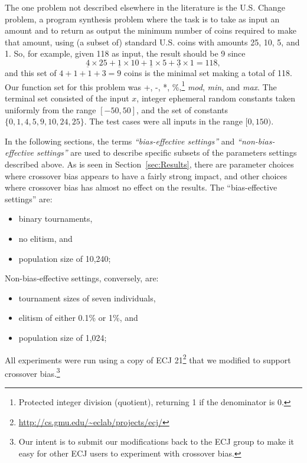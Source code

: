 \documentclass{sig-alternate}
\begin{document}
The one problem not described elsewhere in the literature is the U.S. Change problem, a program 
synthesis problem where the task is to take as input an amount and to return as output the minimum 
number of coins required to make that amount, using (a subset of) standard U.S. coins with amounts 
25, 10, 5, and 1. So, for example, given 118 as input, the result should be 9 since 
\[
	\underline{4} \times 25 + \underline{1} \times 10 + \underline{1} \times 5 + \underline{3} \times 1 = 118,
\]
and this set of $4+1+1+3 = 9$ coins is the minimal set 
making a total of 118. Our function set for this problem was +, -, *, \%,\footnote{Protected integer 
division (quotient), returning 1 if the denominator is 0.} \emph{mod}, \emph{min}, and \emph{max}. 
The terminal set consisted of the input $x$, integer ephemeral random constants taken uniformly 
from the range $[-50, 50]$, and the set of constants $\{ 0, 1, 4, 5, 9, 10, 24, 25 \}$. The test cases 
were all inputs in the range $[0, 150)$.


In the following sections, the terms \emph{``bias-effective settings''} and \emph{``non-bias-effective settings''} 
are used to
describe specific subsets of the parameters settings described above. As is seen in Section~\ref{sec:Results}, 
there are parameter choices where crossover bias appears to have a fairly strong impact, and other choices 
where crossover bias has almost no effect on the results. The ``bias-effective settings'' are:
\begin{itemize}
\item binary tournaments,
\item no elitism, and
\item population size of 10,240;
\end{itemize}
Non-bias-effective settings, conversely, are:
\begin{itemize}
\item tournament sizes of seven individuals,
\item elitism of either 0.1\% or 1\%, and
\item population size of 1,024;
\end{itemize}

All experiments were run using a copy of ECJ 21\footnote{\url{http://cs.gmu.edu/~eclab/projects/ecj/}} 
that we modified to support crossover bias.\footnote{Our intent is to submit our modifications back to the 
ECJ group to make it easy for other ECJ users to experiment with crossover bias.}
\end{document}
